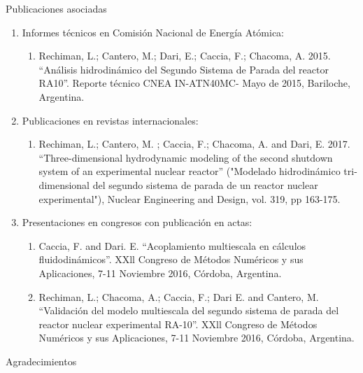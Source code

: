 \documentclass[12pt,screen,twoside,pagebackref]{ibtesis}
\begin{document}
\begin{postliminary}

\begin{seccion}{Publicaciones asociadas}
\begin{enumerate}

\item Informes técnicos en Comisión Nacional de Energía Atómica:
\begin{enumerate}
\item Rechiman, L.; Cantero, M.; Dari, E.; Caccia, F.; Chacoma, A. 2015. “Análisis hidrodinámico del Segundo Sistema de Parada del reactor RA10”. Reporte técnico CNEA IN-ATN40MC- Mayo de 2015, Bariloche, Argentina.
\end{enumerate}

\item Publicaciones en revistas internacionales:
\begin{enumerate}
\item Rechiman, L.; Cantero, M. ; Caccia, F.; Chacoma, A. and Dari, E. 2017. “Three-dimensional hydrodynamic modeling of the second shutdown system of an experimental nuclear reactor” ("Modelado hidrodinámico tri-dimensional del segundo sistema de parada de un reactor nuclear experimental"), Nuclear Engineering and Design, vol. 319, pp 163-175.
\end{enumerate}

\item Presentaciones en congresos con publicación en actas:
\begin{enumerate}
\item Caccia, F. and Dari. E. “Acoplamiento multiescala en cálculos fluidodinámicos”. XXll Congreso de Métodos Numéricos y sus Aplicaciones, 7-11 Noviembre 2016, Córdoba, Argentina.

\item Rechiman, L.; Chacoma, A.; Caccia, F.; Dari E. and Cantero, M. “Validación del modelo multiescala del segundo sistema de parada del reactor nuclear experimental RA-10”. XXll Congreso de Métodos Numéricos y sus Aplicaciones, 7-11 Noviembre 2016, Córdoba, Argentina.
\end{enumerate}

\end{enumerate}
\end{seccion}

\begin{seccion}{Agradecimientos}

\end{seccion}

\end{postliminary}
\end{document}
